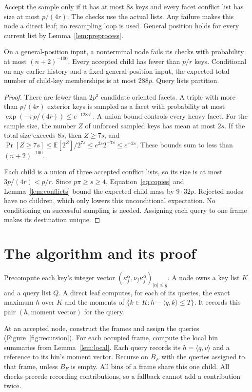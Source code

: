 \documentclass[notab,a4paper,UKenglish,numberwithinsect]{socg-lipics-v2021}
\newcommand{\ip}[2]{\langle #1,#2\rangle}
\begin{document}
Accept the sample only if it has at most $8s$ keys and every facet conflict list has size at most $p/(4r)$. The checks use the actual lists. Any failure makes this node a direct leaf; no resampling loop is used. General position holds for every current list by Lemma~\ref{lem:preprocess}.

\begin{lemma}\label{lem:step}
On a general-position input, a nonterminal node fails its checks with probability at most $(n+2)^{-100}$. Every accepted child has fewer than $p/r$ keys. Conditional on any earlier history and a fixed general-position input, the expected total number of child-key memberships is at most $288p$. Query lists partition.
\end{lemma}
\begin{proof}
There are fewer than $2p^3$ candidate oriented facets. A triple with more than $p/(4r)$ exterior keys is sampled as a facet with probability at most
$\exp(-\pi p/(4r))\le e^{-128\ell}$.
A union bound controls every heavy facet. For the sample size, the number $Z$ of unforced sampled keys has mean at most $2s$. If the total size exceeds $8s$, then $Z\ge7s$, and
$\Pr[Z\ge7s]\le \mathbb E[2^Z]/2^{7s}\le e^{2s}2^{-7s}\le e^{-2s}$.
These bounds sum to less than $(n+2)^{-100}$.

Each child is a union of three accepted conflict lists, so its size is at most $3p/(4r)<p/r$. Since $p\pi\ge s\ge4$, Equation~\eqref{eq:copies} and Lemma~\ref{lem:conflicts} bound the expected child mass by $9\cdot32p$. Rejected nodes have no children, which only lowers this unconditional expectation. No conditioning on successful sampling is needed. Assigning each query to one frame makes its destination unique.
\end{proof}

\section{The algorithm and its proof}\label{sec:algorithm}
Precompute each key's integer vector $(\kappa_j^\alpha,\nu_j\kappa_j^\alpha)_{|\alpha|\le g}$. A node owns a key list $K$ and a query list $Q$. A direct leaf computes, for each of its queries, the exact maximum $h$ over $K$ and the moments of $\{k\in K:h-\ip qk\le T\}$. It records this pair $(h,\text{moment vector})$ for the query.

At an accepted node, construct the frames and assign the queries (Figure~\ref{fig:recursion}). For each occupied frame, compute the local bin summaries from Lemma~\ref{lem:local}. Each query records its $h=\ip qv$ and a reference to its bin's moment vector. Recurse on $B_F$ with the queries assigned to that frame, unless $B_F$ is empty. All bins of a frame share this one child. All checks precede recording contributions, so a fallback cannot add a contribution twice.
\end{document}
